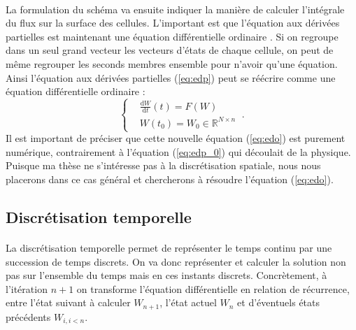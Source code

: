 		\paragraph{}
		La formulation du schéma va ensuite indiquer la manière de calculer l'intégrale du flux sur la surface des cellules.
		L'important est que l'équation aux dérivées partielles est maintenant une équation différentielle ordinaire \cite{TrefethenBirkissonDriscoll2017}.
		Si on regroupe dans un seul grand vecteur les vecteurs d'états de chaque cellule, on peut de même regrouper les seconds membres ensemble pour n'avoir qu'une équation.
		Ainsi l'équation aux dérivées partielles (\ref{eq:edp}) peut se réécrire comme une équation différentielle ordinaire :
		\begin{equation}\label{eq:edo}
			\left\{\begin{aligned}
				&\frac{\mathrm{d}W}{\mathrm{d}t}\left(t\right) = F\left(W\right) \\
				&W\left(t_0\right) = W_0\in\mathbb{R}^{N\times n}
			\end{aligned}\right.\ .
		\end{equation}
		Il est important de préciser que cette nouvelle équation (\ref{eq:edo}) est purement numérique, contrairement à l'équation (\ref{eq:edp_0}) qui découlait de la physique.
		Puisque ma thèse ne s'intéresse pas à la discrétisation spatiale, nous nous placerons dans ce cas général et chercherons à résoudre l'équation (\ref{eq:edo}).

	\subsection{Discrétisation temporelle}

		\paragraph{}
		La discrétisation temporelle permet de représenter le temps continu par une succession de temps discrets.
		On va donc représenter et calculer la solution non pas sur l'ensemble du temps mais en ces instants discrets.
		Concrètement, à l'itération $n+1$ on transforme l'équation différentielle en relation de récurrence, entre l'état suivant à calculer $W_{n+1}$, l'état actuel $W_n$ et d'éventuels états précédents $W_{i,i<n}$.

